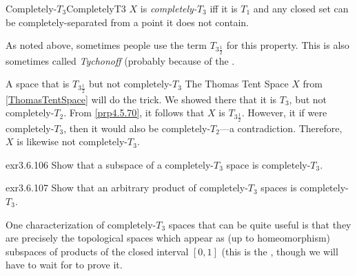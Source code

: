 \begin{dfn}{Completely-$T_3$}{CompletelyT3}
$X$ is \emph{completely-$T_3$} iff it is $T_1$ and any closed set can be completely-separated from a point it does not contain.
\begin{rmk}
As noted above, sometimes people use the term $T_{3\frac{1}{2}}$ for this property.  This is also sometimes called \emph{Tychonoff} (probably because of the .
\end{rmk}
\end{dfn}
\begin{exm}{A space that is $T_{3\frac{1}{2}}$ but not completely-$T_3$}{}
The Thomas Tent Space $X$ from \cref{ThomasTentSpace} will do the trick.  We showed there that it is $T_3$, but not completely-$T_2$.  From \cref{prp4.5.70}, it follows that $X$ is $T_{3\frac{1}{2}}$.  However, it if were completely-$T_3$, then it would also be completely-$T_2$---a contradiction.  Therefore, $X$ is likewise not completely-$T_3$.
\end{exm}
\begin{exr}{}{exr3.6.106}
Show that a subspace of a completely-$T_3$ space is completely-$T_3$.
\end{exr}
\begin{exr}{}{exr3.6.107}
Show that an arbitrary product of completely-$T_3$ spaces is completely-$T_3$.
\end{exr}
One characterization of completely-$T_3$ spaces that can be quite useful is that they are precisely the topological spaces which appear as (up to homeomorphism) subspaces of products of the closed interval $[0,1]$ (this is the , though we will have to wait for  to prove it.

